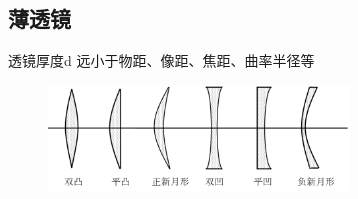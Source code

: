 \subsection{薄透镜}
\begin{description}[leftmargin=0.7cm,style=nextline,nosep]%
    \item[薄透镜] 透镜厚度d 远小于物距、像距、焦距、曲率半径等 
    \item[分类]         \begin{figure}[H]
                \centering
                \includegraphics[width=8cm]{img/1.5.png}
                \end{figure}
\end{description}
